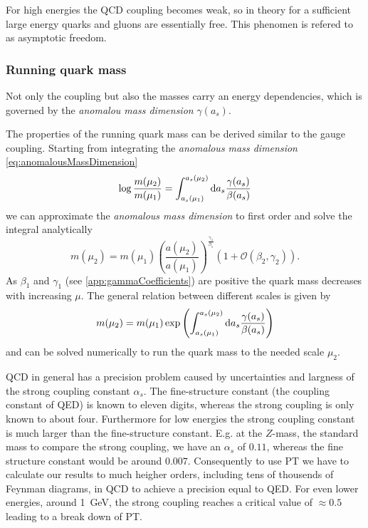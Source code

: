 \documentclass[../../index.tex]{subfiles}
\begin{document}
For high energies the QCD coupling becomes weak, so in theory for a sufficient
large energy quarks and gluons are essentially free. This phenomen is refered to
as asymptotic freedom. 


\subsubsection{Running quark mass}
Not only the coupling but also the masses carry an energy dependencies, which is
governed by the \textit{anomalou mass dimension} $\gamma(a_s)$.

The properties of the running quark mass can be derived similar to the gauge
coupling. Starting from integrating the \textit{anomalous mass dimension} \ref{eq:anomalousMassDimension}
\begin{equation}
  \log \frac{m(\mu_2)}{m(\mu_1)} = \int_{a_s(\mu_1)}^{a_s(\mu_2)} \dif a_s \frac{\gamma(a_s)}{\beta(a_s)}
\end{equation}
we can approximate the \textit{anomalous mass dimension} to first order and
solve the integral analytically \cite{Schwab2002}
\begin{equation}
  m(\mu_2) = m(\mu_1)\left( \frac{a(\mu_2)}{a(\mu_1)} \right)^{\frac{\gamma_1}{\beta_1}} \left( 1 + \mathcal{O}(\beta_2, \gamma_2) \right).
\end{equation}
As $\beta_1$ and $\gamma_1$ (see \ref{app:gammaCoefficients}) are positive the
quark mass decreases with increasing $\mu$.
The general relation between different scales is given by
\begin{equation}
  m(\mu_2) = m(\mu_1) \exp \left( \int_{a_s(\mu_1)}^{a_s(\mu_2)} \dif a_s \frac{\gamma(a_s)}{\beta(a_s)}  \right)
\end{equation}
and can be solved numerically to run the quark mass to the needed scale $\mu_2$.

QCD in general has a precision problem caused by uncertainties and largness of the strong
coupling constant $\alpha_s$. The fine-structure constant (the coupling constant
of QED) is known to eleven digits, whereas the strong coupling is only known to
about four. Furthermore for low energies the strong coupling constant is much
larger than the fine-structure constant. E.g. at the $Z$-mass, the standard mass
to compare the strong coupling, we have an $\alpha_s$ of $0.11$, whereas the
fine structure constant would be around $0.007$. Consequently to use PT we have to
calculate our results to much heigher orders, including tens of thousends of
Feynman diagrams, in QCD to achieve a precision equal to QED. For even lower
energies, around \SI{1}{\giga\eV}, the strong coupling reaches a critical value
of $\approx 0.5$ leading to a break down of PT.
\end{document}
